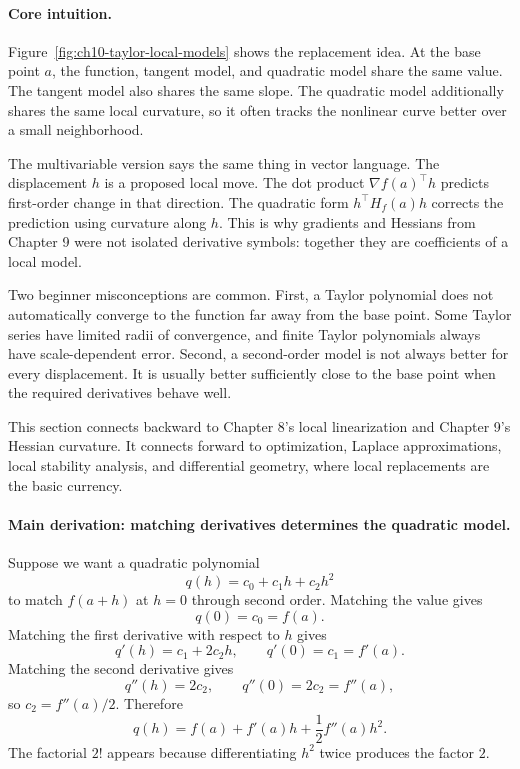 \paragraph{Core intuition.}
Figure~\ref{fig:ch10-taylor-local-models} shows the replacement idea. At the base point \(a\), the function, tangent model, and quadratic model share the same value. The tangent model also shares the same slope. The quadratic model additionally shares the same local curvature, so it often tracks the nonlinear curve better over a small neighborhood.

The multivariable version says the same thing in vector language. The displacement \(h\) is a proposed local move. The dot product \(\nabla f(a)^\top h\) predicts first-order change in that direction. The quadratic form \(h^\top H_f(a)h\) corrects the prediction using curvature along \(h\). This is why gradients and Hessians from Chapter 9 were not isolated derivative symbols: together they are coefficients of a local model.

Two beginner misconceptions are common. First, a Taylor polynomial does not automatically converge to the function far away from the base point. Some Taylor series have limited radii of convergence, and finite Taylor polynomials always have scale-dependent error. Second, a second-order model is not always better for every displacement. It is usually better sufficiently close to the base point when the required derivatives behave well.

This section connects backward to Chapter 8's local linearization and Chapter 9's Hessian curvature. It connects forward to optimization, Laplace approximations, local stability analysis, and differential geometry, where local replacements are the basic currency.

\paragraph{Main derivation: matching derivatives determines the quadratic model.}
Suppose we want a quadratic polynomial
\[
q(h)=c_0+c_1h+c_2h^2
\]
to match \(f(a+h)\) at \(h=0\) through second order. Matching the value gives
\[
q(0)=c_0=f(a).
\]
Matching the first derivative with respect to \(h\) gives
\[
q'(h)=c_1+2c_2h,
\qquad
q'(0)=c_1=f'(a).
\]
Matching the second derivative gives
\[
q''(h)=2c_2,
\qquad
q''(0)=2c_2=f''(a),
\]
so \(c_2=f''(a)/2\). Therefore
\[
q(h)=f(a)+f'(a)h+\frac{1}{2}f''(a)h^2.
\]
The factorial \(2!\) appears because differentiating \(h^2\) twice produces the factor \(2\).

